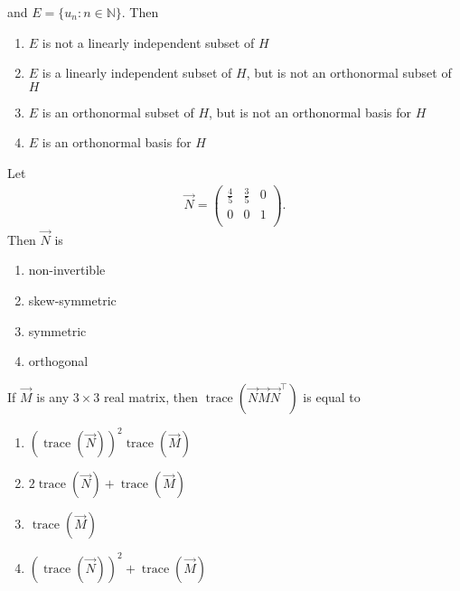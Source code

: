 and $E = \{u_n : n \in \mathbb{N}\}$. Then
\hfill{}

\begin{enumerate}
    \item $E$ is not a linearly independent subset of $H$
    \item $E$ is a linearly independent subset of $H$, but is not an orthonormal subset of $H$
    \item $E$ is an orthonormal subset of $H$, but is not an orthonormal basis for $H$
    \item $E$ is an orthonormal basis for $H$
\end{enumerate}

\item
Let
\begin{align*}
   \vec{N} =
\begin{pmatrix}
\frac{4}{5} & \frac{3}{5} & 0 \\
0 & 0 & 1 \\
\end{pmatrix}. 
\end{align*}
Then $\vec{N}$ is
\hfill{}
\begin{multicols}{4}
\begin{enumerate}
    \item non-invertible
    \item skew-symmetric
    \item symmetric
    \item orthogonal
\end{enumerate}
\end{multicols}

\item
If $\vec{M}$ is any $3 \times 3$ real matrix, then $\operatorname{trace}(\vec{N} \vec{M} \vec{N}^{\top})$ is equal to
\hfill{}
\begin{multicols}{2}
\begin{enumerate}
    \item $(\operatorname{trace}(\vec{N}))^2 \operatorname{trace}(\vec{M})$
    \item $2 \operatorname{trace}(\vec{N}) + \operatorname{trace}(\vec{M})$
    \item $\operatorname{trace}(\vec{M})$
    \item $(\operatorname{trace}(\vec{N}))^2 + \operatorname{trace}(\vec{M})$
\end{enumerate}
\end{multicols}
